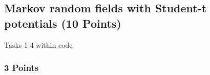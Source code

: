 \newif\ifvimbug
\vimbugfalse

\ifvimbug

\fi


\subsection{Markov random fields with Student-t potentials (10 Points)}
Tasks 1-4 within code
\setcounter{subsubsection}{4}
\subsubsection{3 Points}
